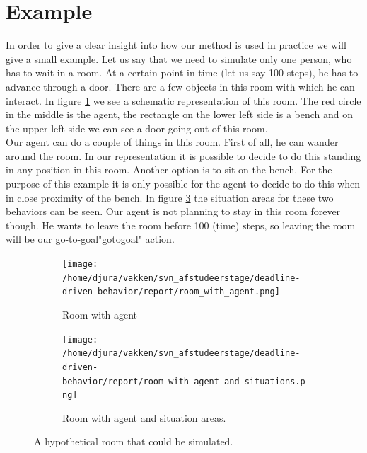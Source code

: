 \documentclass[11pt, a4paper]{book}
\begin{document}
\clearpage

\section{Example}
In order to give a clear insight into how our method is used in practice we will give a small example. Let us say that we need to simulate only one person, who has to wait in a room. At a certain point in time (let us say 100 steps), he has to advance through a door. There are a few objects in this room with which he can interact. In figure  \ref{fig:roomwithagent} we see a schematic representation of this room. The red circle in the middle is the agent, the rectangle on the lower left side is a bench and on the upper left side we can see a door going out of this room.\\
Our agent can do a couple of things in this room. First of all, he can wander around the room. In our representation it is possible to decide to do this standing in any position in this room. Another option is to sit on the bench. For the purpose of this example it is only possible for the agent to decide to do this when in close proximity of the bench. In figure \ref{fig:roomwithagentsituations} the situation areas for these two behaviors can be seen. Our agent is not planning to stay in this room forever though. He wants to leave the room before 100 (time) steps, so leaving the room will be our go-to-goal"gotogoal" action.

\begin{figure}
\centering
\begin{subfigure}[b]{0.5\textwidth}
\centering
\texttt{[image: /home/djura/vakken/svn\_afstudeerstage/deadline-driven-behavior/report/room\_with\_agent.png]}
\caption{Room with agent}
\label{fig:roomwithagent}
\end{subfigure}%
\begin{subfigure}[b]{0.5\textwidth}
\centering            
\texttt{[image: /home/djura/vakken/svn\_afstudeerstage/deadline-driven-behavior/report/room\_with\_agent\_and\_situations.png]}
\caption{Room with agent and situation areas.}
\label{fig:roomwithagentsituations}
\end{subfigure}
\caption{A hypothetical room that could be simulated.}
\end{figure}
\end{document}

